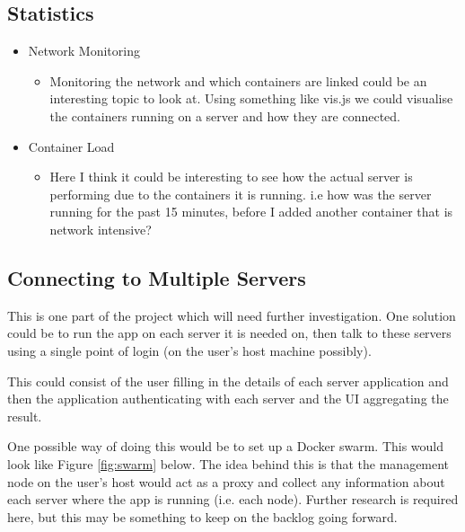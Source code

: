\documentclass{article}
\begin{document}
\subsection{Statistics}
\begin{itemize}
	\item Network Monitoring
	\begin{itemize}
		\item Monitoring the network and which containers are linked could be an interesting topic to look at. Using something like
    vis.js we could visualise the containers running on a server and how they are connected.
	\end{itemize}
	\item Container Load
	\begin{itemize}
		\item Here I think it could be interesting to see how the actual server is performing due to the containers it is running. i.e how was the server running for the past 15 minutes, before I added another container that is network intensive?
	\end{itemize}
\end{itemize}

\newpage

\subsection{Connecting to Multiple Servers}
This is one part of the project which will need further investigation. One solution could be to run the app on each server it is needed on, then talk to these servers using a single point of login (on the user's host machine possibly). 

This could consist of the user filling in the details of each server application and then the application authenticating with each server and the UI aggregating the result. 

One possible way of doing this would be to set up a Docker swarm. This would look like Figure \ref{fig:swarm} below. The idea behind this is that the management node on the user's host would act as a proxy and collect any information about each server where the app is running (i.e. each node). Further research is required here, but this may be something to keep on the backlog going forward.
\vspace{1.5cm}
\end{document}
